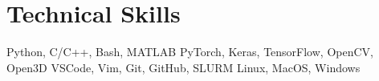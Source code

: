 \section{Technical Skills}

\setlength{\multicolsep}{-4pt}
\begin{multicols}{2}
    \raggedcolumns

    \resumeSubHeadingListStart
    {Python, C/C++, Bash, MATLAB}
    {PyTorch, Keras, TensorFlow, OpenCV, Open3D}
    {VSCode, Vim, Git, GitHub, SLURM}
    {Linux, MacOS, Windows}
    \resumeSubHeadingListEnd

\end{multicols}

